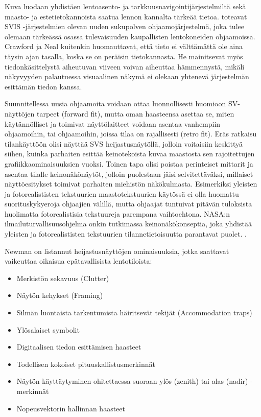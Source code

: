\documentclass[utf8,bachelor,manualbib]{gradu3}
\begin{document}
Kuva luodaan yhdistäen lentoasento- ja tarkkuusnavigointijärjestelmiltä sekä maasto- ja estetietokannoista saatua lennon kannalta tärkeää tietoa. \cite{schnellym2004} toteavat SVIS -järjestelmien olevan uuden sukupolven ohjaamojärjestelmä, joka tulee olemaan tärkeässä osassa tulevaisuuden kaupallisten lentokoneiden ohjaamoissa. Crawford ja Neal kuitenkin \citeyearpar{crawfordneal2006} huomauttavat, että tieto ei välttämättä ole aina täysin ajan tasalla, koska se on peräisin tietokannasta. He mainitsevat myös tiedonkäsittelystä aiheutuvan viiveen voivan aiheuttaa hämmennystä, mikäli näkyvyyden palautuessa visuaalinen näkymä ei olekaan yhtenevä järjestelmän esittämän tiedon kanssa.

Suunnitellessa uusia ohjaamoita voidaan ottaa luonnollisesti huomioon SV-näyttöjen tarpeet (forward fit), mutta oman haasteensa asettaa se, miten käytännölliset ja toimivat näyttölaitteet voidaan asentaa vanhempiin ohjaamoihin, tai ohjaamoihin, joissa tilaa on rajallisesti (retro fit). Eräs ratkaisu tilankäyttöön olisi näyttää SVS heijastusnäytöllä, jolloin voitaisiin keskittyä siihen, kuinka parhaiten esittää keinotekoista kuvaa maastosta sen rajoitettujen grafiikkaominaisuuksien vuoksi. Toinen tapa olisi poistaa perinteiset mittarit ja asentaa tilalle keinonäkönäytöt, jolloin puolestaan jäisi selvitettäväksi, millaiset näyttöesitykset toimivat parhaiten miehistön näkökulmasta. Esimerkiksi yleisten ja fotorealististen tekstuurien maastotekstuurien käytössä ei olla huomattu suorituskykyeroja ohjaajien välillä, mutta ohjaajat tuntuivat pitävän tuloksista huolimatta fotorealistisia tekstuureja parempana vaihtoehtona. NASA:n ilmailuturvallisuusohjelma onkin tutkimassa keinonäkökonseptia, joka yhdistää yleisten ja fotorealististen tekstuurien tilannetietoisuutta parantavat puolet. \citep{prinzel2004}.

Newman \citeyearpar{newman2000} on listannut heijastusnäyttöjen ominaisuuksia, jotka saattavat vaikeuttaa oikaisua epätavallisista lentotiloista:

\begin{itemize}
\item Merkistön sekavuus (Clutter)
\item Näytön kehykset (Framing)
\item Silmän luontaista tarkentumista häiritsevät tekijät (Accommodation traps)
\item Ylösalaiset symbolit
\item Digitaalisen tiedon esittämisen haasteet
\item Todellisen kokoiset pituuskallistusmerkinnät
\item Näytön käyttäytyminen ohitettaessa suoraan ylös (zenith) tai alas (nadir) -merkinnät
\item Nopeusvektorin hallinnan haasteet
\end{itemize} 
\end{document}
